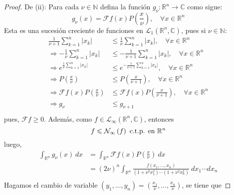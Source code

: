 \documentclass[12pt]{report}
\newcounter{it}
\theoremstyle{largebreak}
\renewcommand{\leq}{\ensuremath{\leqslant}}
\renewcommand{\geq}{\ensuremath{\geqslant}}
\newcommand\abs[1]{\ensuremath{\left|#1\right|}}
\newcommand\cf[3]{\ensuremath{#1:#2\rightarrow#3}}
\newcommand{\N}[2]{\ensuremath{\mathcal{N}_{#1}\left(#2\right)}}
\newcommand{\fou}[1]{\ensuremath{\mathcal{F}#1}}
\begin{document}
\begin{proof}
        De (ii): Para cada $\nu\in\mathbb{N}$ defina la función $\cf{g_\nu}{\mathbb{R}^n}{\mathbb{C}}$ como sigue:
        \begin{equation*}
            g_\nu(x)=\fou{f}(x)P\left(\frac{x}{\nu}\right),\quad\forall x\in\mathbb{R}^n
        \end{equation*}
        Esta es una sucesión creciente de funciones en $\mathcal{L}_1(\mathbb{R}^n,\mathbb{C})$, pues si $\nu\in\mathbb{N}$:
        \begin{equation*}
            \begin{split}
                \frac{1}{\nu+1}\sum_{ k=1}^n\abs{x_k}&\leq\frac{1}{\nu}\sum_{ k=1}^n\abs{x_k},\quad\forall x\in\mathbb{R}^n\\
                \Rightarrow -\frac{1}{\nu}\sum_{ k=1}^n\abs{x_k}&\leq-\frac{1}{\nu+1}\sum_{ k=1}^n\abs{x_k},\quad\forall x\in\mathbb{R}^n\\
                \Rightarrow e^{\frac{1}{\nu}\sum_{ k=1}^n\abs{x_k}}&\leq e^{-\frac{1}{\nu+1}\sum_{ k=1}^n\abs{x_k}},\quad\forall x\in\mathbb{R}^n\\
                \Rightarrow P\left(\frac{x}{\nu}\right)&\leq P\left(\frac{x}{\nu+1}\right),\quad\forall x\in\mathbb{R}^n \\
                \Rightarrow  \fou{f}(x)P\left(\frac{x}{\nu}\right)&\leq \fou{f}(x)P\left(\frac{x}{\nu+1}\right),\quad\forall x\in\mathbb{R}^n \\
                \Rightarrow  g_\nu&\leq g_{\nu+1} \\
            \end{split}
        \end{equation*}
        pues, $\fou{f}\geq0$.
        Además, como $f\in\mathcal{L}_{\infty}(\mathbb{R}^n,\mathbb{C})$, entonces
        \begin{equation*}
            f\leq\N{\infty}{f}\textup{ c.t.p. en }\mathbb{R}^n
        \end{equation*}
        luego,
        \begin{equation*}
            \begin{split}
                \int_{\mathbb{R}^n}g_\nu(x)\:dx&=\int_{\mathbb{R}^n}\fou{f}(x)P\left(\frac{x}{\nu}\right)\:dx\\
                &=(2\nu)^n\int_{\mathbb{R}^n}\frac{f(x_1,...,x_n)}{(1+\nu^2x_1^2)\cdots(1+\nu^2x_n^2)}\:dx_1\cdots dx_n\\
            \end{split}
        \end{equation*}
        Hagamos el cambio de variable $(y_1,...,y_n)=(\frac{x_1}{\nu},...,\frac{x_n}{\nu})$, se tiene que

\end{proof}
\end{document}
